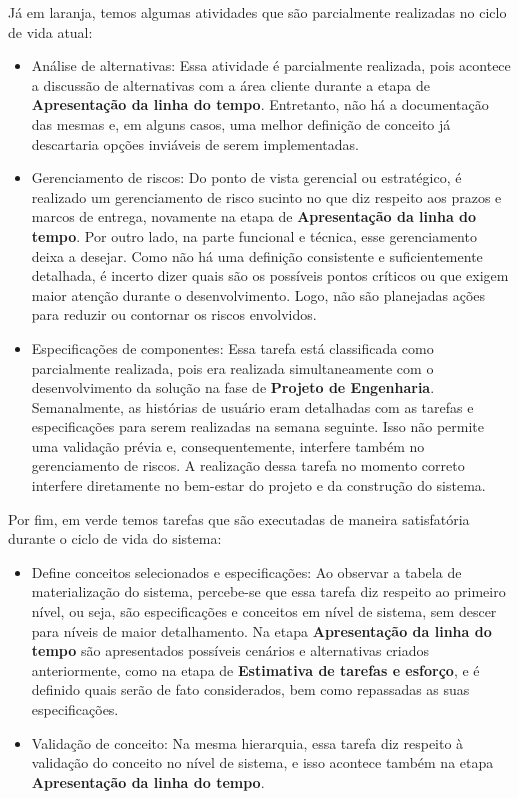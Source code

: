 	Já em laranja, temos algumas atividades que são parcialmente realizadas no ciclo de vida atual:
	\begin{itemize}
		\item Análise de alternativas: Essa atividade é parcialmente realizada, pois acontece a discussão de alternativas com
		a área cliente durante a etapa de \textbf{Apresentação da linha do tempo}. Entretanto, não há a documentação das mesmas e, em alguns casos, uma melhor definição de conceito já descartaria opções
		inviáveis de serem implementadas.  
		\item Gerenciamento de riscos: Do ponto de vista gerencial ou estratégico, é realizado um gerenciamento de risco sucinto no que
		diz respeito aos prazos e marcos de entrega, novamente na etapa de \textbf{Apresentação da linha do tempo}. Por outro lado, na parte funcional e técnica, esse gerenciamento deixa a desejar. Como não
		há uma definição consistente e suficientemente detalhada, é incerto dizer quais são os possíveis pontos críticos ou que exigem maior atenção durante o desenvolvimento.
		Logo, não são planejadas ações para reduzir ou contornar os riscos envolvidos.
		\item Especificações de componentes: Essa tarefa está classificada como parcialmente realizada, pois era realizada simultaneamente com o desenvolvimento da solução na fase de \textbf{Projeto de Engenharia}.
		Semanalmente, as histórias de usuário eram detalhadas com as tarefas e especificações para serem realizadas na semana seguinte. Isso não permite uma validação prévia e, consequentemente, interfere também no gerenciamento de riscos.
		A realização dessa tarefa no momento correto interfere diretamente no bem-estar do projeto e da construção do sistema.
	\end{itemize}

	Por fim, em verde temos tarefas que são executadas de maneira satisfatória durante o ciclo de vida do sistema:
	\begin{itemize}
			\item Define conceitos selecionados e especificações: Ao observar a tabela de materialização do sistema, percebe-se que essa tarefa diz
			respeito ao primeiro nível, ou seja, são especificações e conceitos em nível de sistema, sem descer para níveis de maior detalhamento. Na
			etapa \textbf{Apresentação da linha do tempo} são apresentados possíveis cenários e alternativas criados anteriormente, como na etapa
			de \textbf{Estimativa de tarefas e esforço}, e é definido quais serão de fato considerados, bem como repassadas as suas especificações.
			\item Validação de conceito: Na mesma hierarquia, essa tarefa diz respeito à validação do conceito no nível de sistema, e isso 
			acontece também na etapa \textbf{Apresentação da linha do tempo}.
	\end{itemize}

